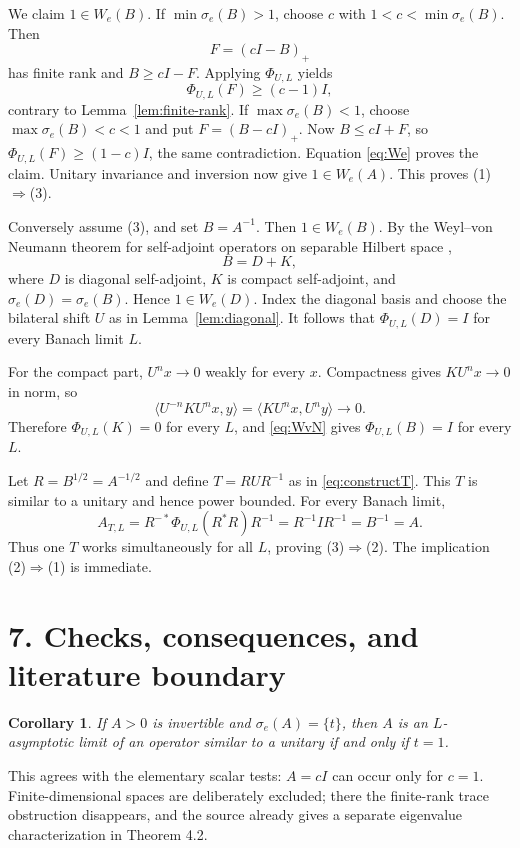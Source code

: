 \documentclass[11pt]{article}
\newtheorem{corollary}[theorem]{Corollary}
\newcommand{\We}{W_{\!e}}
\newcommand{\PhiUL}{\Phi_{U,L}}
\begin{document}
We claim $1\in\We(B)$.  If $\min\sigma_e(B)>1$, choose $c$ with $1<c<\min\sigma_e(B)$.  Then
\[
 F=(cI-B)_+
\]
has finite rank and $B\geq cI-F$.  Applying $\PhiUL$ yields
\[
 \PhiUL(F)\geq(c-1)I,
\]
contrary to Lemma~\ref{lem:finite-rank}.  If $\max\sigma_e(B)<1$, choose $\max\sigma_e(B)<c<1$ and put $F=(B-cI)_+$.  Now $B\leq cI+F$, so $\PhiUL(F)\geq(1-c)I$, the same contradiction.  Equation \eqref{eq:We} proves the claim.  Unitary invariance and inversion now give $1\in\We(A)$.  This proves (1)$\Rightarrow$(3).

Conversely assume (3), and set $B=A^{-1}$.  Then $1\in\We(B)$.  By the Weyl--von Neumann theorem for self-adjoint operators on separable Hilbert space \cite{WvN},
\begin{equation}\label{eq:WvN}
 B=D+K,
\end{equation}
where $D$ is diagonal self-adjoint, $K$ is compact self-adjoint, and $\sigma_e(D)=\sigma_e(B)$.  Hence $1\in\We(D)$.  Index the diagonal basis and choose the bilateral shift $U$ as in Lemma~\ref{lem:diagonal}.  It follows that $\PhiUL(D)=I$ for every Banach limit $L$.

For the compact part, $U^nx\to0$ weakly for every $x$.  Compactness gives $KU^nx\to0$ in norm, so
\[
 \langle U^{-n}KU^n x,y\rangle
 =\langle KU^nx,U^ny\rangle\longrightarrow0.
\]
Therefore $\PhiUL(K)=0$ for every $L$, and \eqref{eq:WvN} gives $\PhiUL(B)=I$ for every $L$.

Let $R=B^{1/2}=A^{-1/2}$ and define $T=RUR^{-1}$ as in \eqref{eq:constructT}.  This $T$ is similar to a unitary and hence power bounded.  For every Banach limit,
\[
 A_{T,L}
 =R^{-*}\PhiUL(R^*R)R^{-1}
 =R^{-1}IR^{-1}=B^{-1}=A.
\]
Thus one $T$ works simultaneously for all $L$, proving (3)$\Rightarrow$(2).  The implication (2)$\Rightarrow$(1) is immediate.

\section*{7. Checks, consequences, and literature boundary}

\begin{corollary}
If $A>0$ is invertible and $\sigma_e(A)=\{t\}$, then $A$ is an $L$-asymptotic limit of an operator similar to a unitary if and only if $t=1$.
\end{corollary}

This agrees with the elementary scalar tests: $A=cI$ can occur only for $c=1$.  Finite-dimensional spaces are deliberately excluded; there the finite-rank trace obstruction disappears, and the source already gives a separate eigenvalue characterization in Theorem 4.2.
\end{document}

